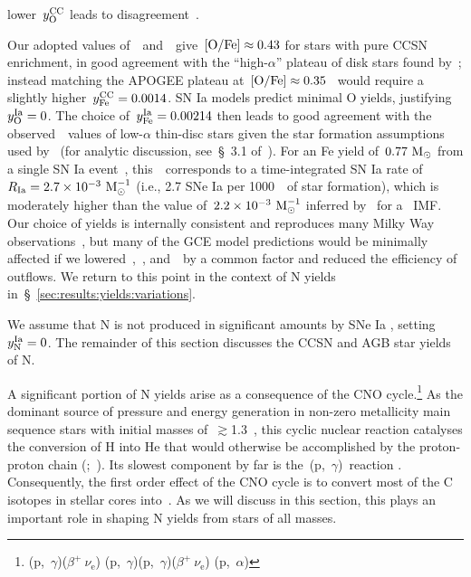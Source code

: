 \documentclass[ms.tex]{subfiles}
\begin{document}
lower~$y_\text{O}^\text{CC}$ leads to disagreement~\citep{Weinberg2017b}.
\par
Our adopted values of~~and~~give~$\text{[O/Fe]}\approx0.43$ for stars
with pure CCSN enrichment, in good agreement with the ``high-$\alpha$'' plateau
of disk stars found by~\citet{Ramirez2013}; instead matching the APOGEE plateau
at~$\text{[O/Fe]}\approx0.35$~\citep[see, e.g., fig.~6 of][]{Hasselquist2021} would
require a slightly higher~$y_\text{Fe}^\text{CC} = 0.0014$.
SN Ia models predict minimal O yields, justifying~$y_\text{O}^\text{Ia} = 0$.
The choice of~$y_\text{Fe}^\text{Ia} = 0.00214$ then leads to good agreement with the
observed~\ofe~values of low-$\alpha$ thin-disc stars given the star formation
assumptions used by~\citet{Johnson2021} (for analytic discussion, see~\S~3.1
of~\citealp{Weinberg2017}).
For an Fe yield of~$0.77~\text{M}_\odot$ from a single SN Ia event~\citep{Iwamoto1999},
this~~corresponds to a time-integrated SN Ia rate
of~$R_\text{Ia} = 2.7\times10^{-3}~\text{M}_\odot^{-1}$ (i.e., 2.7 SNe Ia per
1000~\msun~of star formation), which is moderately higher than the value
of~$2.2\times10^{-3}~\text{M}_\odot^{-1}$ inferred by~\citet{Maoz2012} for
a~\citet{Kroupa2001} IMF.
Our choice of yields is internally consistent and reproduces many Milky Way
observations~\citep{Johnson2021}, but many of the GCE model predictions would
be minimally affected if we lowered~,~, and~~by a
common factor and reduced the efficiency of outflows.
We return to this point in the context of N yields
in~\S~\ref{sec:results:yields:variations}.
\par
We assume that N is not produced in significant amounts by SNe Ia
\citep{Johnson2019}, setting~$y_\text{N}^\text{Ia} = 0$.
The remainder of this section discusses the CCSN and AGB star yields of N.
\par
A significant portion of N yields arise as a consequence of the CNO
cycle.\footnote{
	\Ctwelve(p,~$\gamma$)\Nthirteen($\beta^+~\nu_\text{e}$)\Cthirteen
	(p,~$\gamma$)\Nfourteen(p,~$\gamma$)\Ofifteen($\beta^+~\nu_\text{e}$)
	\Nfifteen(p,~$\alpha$)\Ctwelve
}
As the dominant source of pressure and energy generation in non-zero
metallicity main sequence stars with initial masses of~$\gtrsim$1.3~\msun, this
cyclic nuclear reaction catalyses the conversion of H into He that would
otherwise be accomplished by the proton-proton chain
(\citealp{vonWeizsaecker1937, vonWeizsaecker1938, Bethe1939a, Bethe1939b,
Adelberger2011};~\citealp*{Suliga2021}).
Its slowest component by far is the~\Nfourteen(p,~$\gamma$)\Ofifteen~reaction
\citep[e.g.][]{LUNA2006}.
Consequently, the first order effect of the CNO cycle is to convert most of the
C isotopes in stellar cores into~\Nfourteen.
As we will discuss in this section, this plays an important role in shaping N
yields from stars of all masses.
\end{document}
